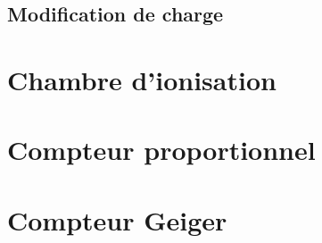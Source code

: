 	\subsection{Modification de charge}%
	
	
	
	
	
	
	
	
	
	
	
	
	
	
	
	
	
	
	
	
	
	
	
	
	
	
	
	
	
	
	
	





\section{Chambre d'ionisation}
\section{Compteur proportionnel}
\section{Compteur Geiger}